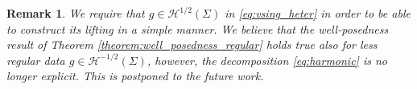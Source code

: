 \documentclass[report]{elsarticle}
\newtheorem{corollary}[theorem]{Corollary}
\newtheorem{lemma}[theorem]{Lemma}
\newtheorem{remark}[theorem]{Remark}
\numberwithin{theorem}{section}
\begin{document}
\begin{remark}
	We require that $g\in \mathcal{H}^{1/2}(\Sigma)$ in \eqref{eq:vsing_heter} in order to be able to construct its lifting in a simple manner.	We believe that the well-posedness result of Theorem \ref{theorem:well_posedness_regular} holds true also for less regular data $g\in\mathcal{H}^{-1/2}(\Sigma)$, however, the decomposition \eqref{eq:harmonic} is no longer explicit. This is postponed to the future work. 
\end{remark}
\end{document}
